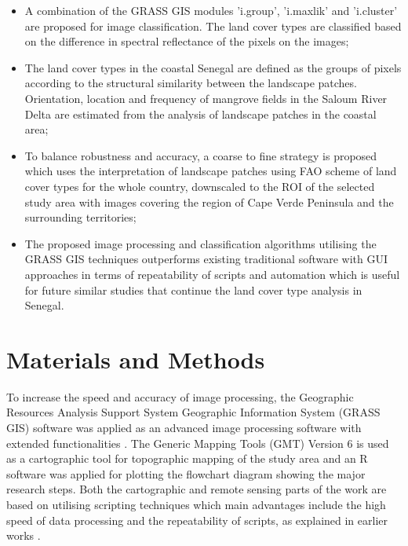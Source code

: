 \documentclass[earth,article,submit,pdftex,moreauthors]{Definitions/mdpi}
\begin{document}
\begin{itemize}
  \item A combination of the GRASS GIS modules 'i.group', 'i.maxlik' and 'i.cluster' are proposed for image classification. The land cover types are classified based on the difference in spectral reflectance of the pixels on the images;
  \item The land cover types in the coastal Senegal are defined as the groups of pixels according to the structural similarity between the landscape patches. Orientation, location and frequency of mangrove fields in the Saloum River Delta are estimated from the analysis of landscape patches in the coastal area;
  \item To balance robustness and accuracy, a coarse to fine strategy is proposed which uses the interpretation of landscape patches using FAO scheme of land cover types for the whole country, downscaled to the ROI of the selected study area with images covering the region of Cape Verde Peninsula and the surrounding territories;
  \item The proposed image processing and classification algorithms utilising the GRASS GIS techniques outperforms existing traditional software with GUI approaches in terms of repeatability of scripts and automation which is useful for future similar studies that continue the land cover type analysis in Senegal.
\end{itemize}

\section{Materials and Methods}

To increase the speed and accuracy of image processing, the Geographic Resources Analysis Support System Geographic Information System (GRASS GIS) software was applied as an advanced image processing software with extended functionalities \cite{Neteleretal2008}. The Generic Mapping Tools (GMT) Version 6 \cite{Wessel} is used as a cartographic tool for topographic mapping of the study area and an R software was applied for plotting the flowchart diagram showing the major research steps.  Both the cartographic and remote sensing parts of the work are based on utilising scripting techniques which main advantages include the high speed of data processing and the repeatability of scripts, as explained in earlier works \cite{min13050604,Lemenkova202213,Lemenkova202206}.

\end{document}
